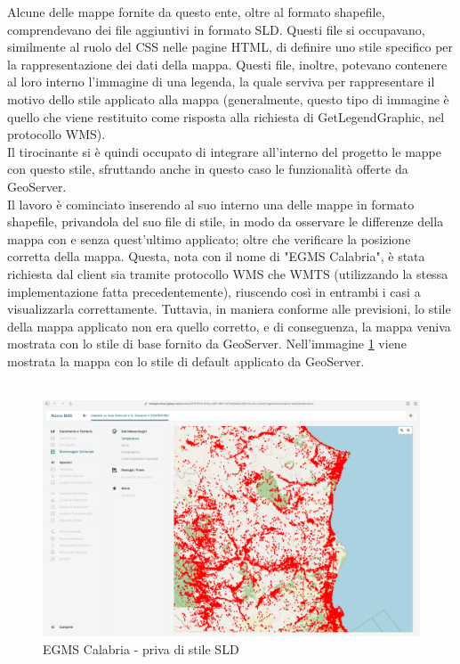 Alcune delle mappe fornite da questo ente, oltre al formato shapefile, comprendevano dei file aggiuntivi in formato SLD. Questi file si occupavano, similmente al ruolo del CSS nelle pagine HTML, di definire uno stile specifico per la rappresentazione dei dati della mappa. Questi file, inoltre, potevano contenere al loro interno l'immagine di una legenda, la quale serviva per rappresentare il motivo dello stile applicato alla mappa (generalmente, questo tipo di immagine è quello che viene restituito come risposta alla richiesta di GetLegendGraphic, nel protocollo WMS).
\\Il tirocinante si è quindi occupato di integrare all'interno del progetto le mappe con questo stile, sfruttando anche in questo caso le funzionalità offerte da GeoServer.
\\Il lavoro è cominciato inserendo al suo interno una delle mappe in formato shapefile, privandola del suo file di stile, in modo da osservare le differenze della mappa con e senza quest'ultimo applicato; oltre che verificare la posizione corretta della mappa. Questa, nota con il nome di "EGMS Calabria", è stata richiesta dal client sia tramite protocollo WMS che WMTS (utilizzando la stessa implementazione fatta precedentemente), riuscendo così in entrambi i casi a visualizzarla correttamente. Tuttavia, in maniera conforme alle previsioni, lo stile della mappa applicato non era quello corretto, e di conseguenza, la mappa veniva mostrata con lo stile di base fornito da GeoServer. Nell'immagine \ref{fig:calabriaNoSLD} viene mostrata la mappa con lo stile di default applicato da GeoServer.
\\~\\ %
\begin{figure}[htbp]
      \centering
      \includegraphics[width=1\textwidth]{Tesi/images/Capitolo5/calabriaNoSLD.jpg}
      \caption{EGMS Calabria - priva di stile SLD}
      \label{fig:calabriaNoSLD}
\end{figure}
